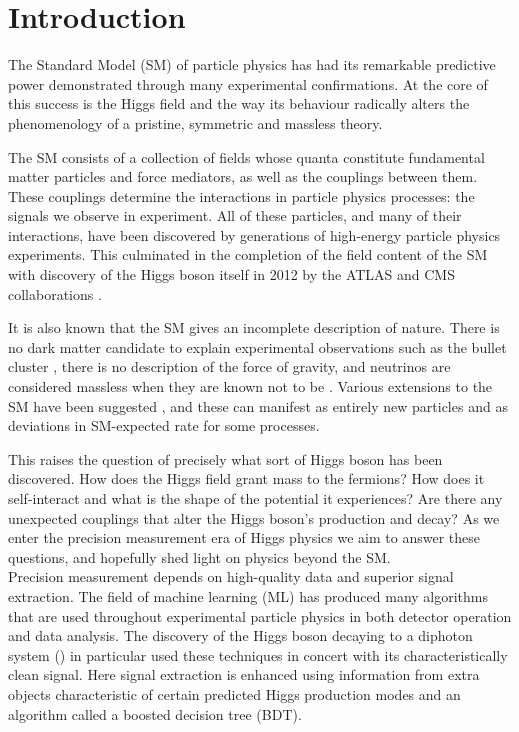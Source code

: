 \chapter{Introduction}
\label{chap:intro}

The Standard Model (SM) of particle physics has had its remarkable predictive power demonstrated through many experimental confirmations. 
At the core of this success is the Higgs field and the way its behaviour radically alters the phenomenology of a pristine, symmetric and massless theory.

The SM consists of a collection of fields whose quanta constitute fundamental matter particles and force mediators, as well as the couplings between them. 
These couplings determine the interactions in particle physics processes: the signals we observe in experiment. 
All of these particles, and many of their interactions, have been discovered by generations of high-energy particle physics experiments. 
This culminated in the completion of the field content of the SM with discovery of the Higgs boson itself in 2012 by the ATLAS and CMS collaborations \cite{ATLAS_Higgs_disc,CMS_Higgs_disc}. 

It is also known that the SM gives an incomplete description of nature. 
There is no dark matter candidate to explain experimental observations such as the bullet cluster \cite{BulletCluster}, there is no description of the force of gravity, 
and neutrinos are considered massless when they are known not to be \cite{NeutrinoOscillation}. 
Various extensions to the SM have been suggested \cite{BSM}, and these can manifest as entirely new particles and as deviations in SM-expected rate for some processes. 

This raises the question of precisely what sort of Higgs boson has been discovered. How does the Higgs field grant mass to the fermions? 
How does it self-interact and what is the shape of the potential it experiences? Are there any unexpected couplings that alter the Higgs boson's production and decay?
As we enter the precision measurement era of Higgs physics we aim to answer these questions, and hopefully shed light on physics beyond the SM.
\\

Precision measurement depends on high-quality data and superior signal extraction.
The field of machine learning (ML) has produced many algorithms that are used throughout experimental particle physics in both detector operation and data analysis. 
The discovery of the Higgs boson decaying to a diphoton system (\Hgg) in particular used these techniques in concert with its characteristically clean signal. 
Here signal extraction is enhanced using information from extra objects characteristic of certain predicted Higgs production modes and an algorithm called a boosted decision tree (BDT). 

